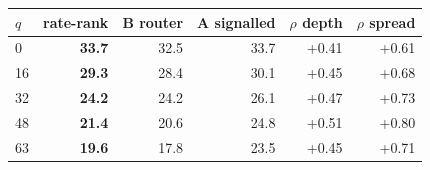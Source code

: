 \begin{tabular}{lrrrrr}
\toprule
$q$ & rate-rank & B router & A signalled & $\rho$ depth & $\rho$ spread \\
\midrule
0 & \textbf{33.7} & 32.5 & 33.7 & +0.41 & +0.61 \\
16 & \textbf{29.3} & 28.4 & 30.1 & +0.45 & +0.68 \\
32 & \textbf{24.2} & 24.2 & 26.1 & +0.47 & +0.73 \\
48 & \textbf{21.4} & 20.6 & 24.8 & +0.51 & +0.80 \\
63 & \textbf{19.6} & 17.8 & 23.5 & +0.45 & +0.71 \\
\bottomrule
\end{tabular}
